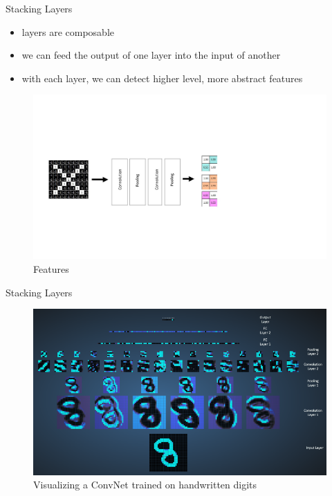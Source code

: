 \documentclass[12pt]{beamer}
\begin{document}
\begin{frame}{Stacking Layers}
  \begin{itemize}
  \item layers are composable
   \item we can feed the output of one layer into the input of another
   \item with each layer, we can detect higher level, more abstract features
    \end{itemize}
\begin{figure}
\includegraphics[width = 0.9\linewidth]{images/stacking.jpg}
\caption{Features}
\label{fig:principle}
\end{figure}

\end{frame}

\begin{frame}{Stacking Layers}
\begin{figure}
\includegraphics[width = 1\linewidth]{images/chain.png}
\caption{Visualizing a ConvNet trained on handwritten digits}
\label{fig:principle}
\end{figure}

\end{frame}
\end{document}

